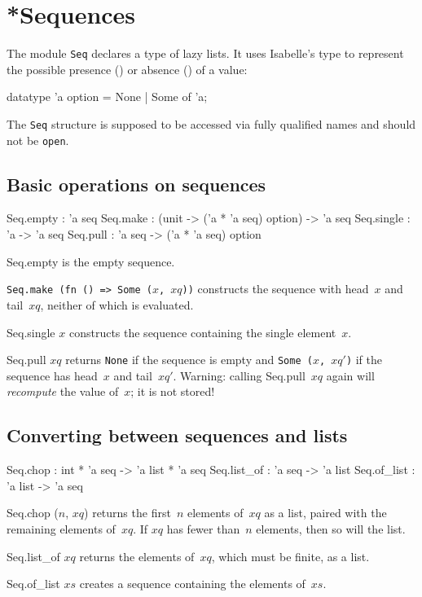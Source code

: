 \section{*Sequences}
The module {\tt Seq} declares a type of lazy lists.  It uses
Isabelle's type  to represent the possible presence
() or absence () of
a value:
\begin{ttbox}
datatype 'a option = None  |  Some of 'a;
\end{ttbox}
The {\tt Seq} structure is supposed to be accessed via fully qualified
names and should not be \texttt{open}.

\subsection{Basic operations on sequences}
\begin{ttbox} 
Seq.empty   : 'a seq
Seq.make    : (unit -> ('a * 'a seq) option) -> 'a seq
Seq.single  : 'a -> 'a seq
Seq.pull    : 'a seq -> ('a * 'a seq) option
\end{ttbox}
\begin{ttdescription}
\item[Seq.empty] is the empty sequence.

\item[\tt Seq.make (fn () => Some ($x$, $xq$))] constructs the
  sequence with head~$x$ and tail~$xq$, neither of which is evaluated.

\item[Seq.single $x$] 
constructs the sequence containing the single element~$x$.

\item[Seq.pull $xq$] returns {\tt None} if the sequence is empty and
  {\tt Some ($x$, $xq'$)} if the sequence has head~$x$ and tail~$xq'$.
  Warning: calling \hbox{Seq.pull $xq$} again will {\it recompute\/}
  the value of~$x$; it is not stored!
\end{ttdescription}


\subsection{Converting between sequences and lists}
\begin{ttbox} 
Seq.chop    : int * 'a seq -> 'a list * 'a seq
Seq.list_of : 'a seq -> 'a list
Seq.of_list : 'a list -> 'a seq
\end{ttbox}
\begin{ttdescription}
\item[Seq.chop ($n$, $xq$)] returns the first~$n$ elements of~$xq$ as a
  list, paired with the remaining elements of~$xq$.  If $xq$ has fewer
  than~$n$ elements, then so will the list.
  
\item[Seq.list_of $xq$] returns the elements of~$xq$, which must be
  finite, as a list.
  
\item[Seq.of_list $xs$] creates a sequence containing the elements
  of~$xs$.
\end{ttdescription}


